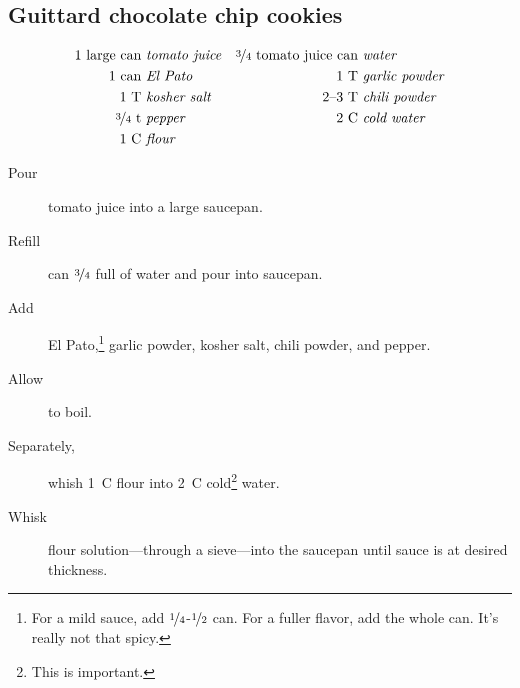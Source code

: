 \subsection{Guittard chocolate chip cookies}

\begin{align*}
    \text{1~large~can} &~\text{\emph{tomato juice}} & \text{\nicefrac{3}{4}~tomato~juice~can} &~\text{\emph{water}} \\
    \text{1~can} &~\text{\emph{El Pato}}            & \text{1~T} &~\text{\emph{garlic powder}}                      \\
    \text{1~T} &~\text{\emph{kosher salt}}          & \text{2--3~T} &~\text{\emph{chili powder}}                    \\
    \text{\nicefrac{3}{4}~t} &~\text{\emph{pepper}} & \text{2~C} &~\text{\emph{cold water}}                         \\
    \text{1~C} &~\text{\emph{flour}}
\end{align*}

\begin{description}
    \item[Pour]tomato juice into a large saucepan.
    \item[Refill]can $\nicefrac{3}{4}$ full of water and pour into saucepan.
    \item[Add]El Pato,\footnote{For a mild sauce, add $\nicefrac{1}{4}$-$\nicefrac{1}{2}$ can. For a fuller flavor, add the whole can. It's really not that spicy.} garlic powder, kosher salt, chili powder, and pepper.
    \item[Allow]to boil.
    \item[Separately,]whish 1~C flour into 2~C cold\footnote{This is important.} water.
    \item[Whisk]flour solution---through a sieve---into the saucepan until sauce is at desired thickness.
\end{description}

\pagebreak
